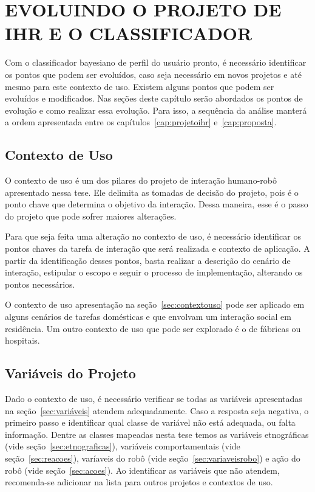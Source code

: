 \chapter{EVOLUINDO O PROJETO DE IHR E O CLASSIFICADOR}
\label{cap:evolucao}
Com o classificador bayesiano de perfil do usuário pronto, é necessário identificar os pontos que podem ser evoluídos, caso seja necessário em novos projetos e até mesmo para este contexto de uso. Existem alguns pontos que podem ser evoluídos e modificados. Nas seções deste capítulo serão abordados os pontos de evolução e como realizar essa evolução. Para isso, a sequência da análise manterá a ordem apresentada entre os capítulos~\ref{cap:projetoihr} e~\ref{cap:proposta}.

\section{Contexto de Uso}
\label{sec:contextouso2}
O contexto de uso é um dos pilares do projeto de interação humano-robô apresentado nessa tese. Ele delimita as tomadas de decisão do projeto, pois é o ponto chave que determina o objetivo da interação. Dessa maneira, esse é o passo do projeto que pode sofrer maiores alterações.

Para que seja feita uma alteração no contexto de uso, é necessário identificar os pontos chaves da tarefa de interação que será realizada e contexto de aplicação. A partir da identificação desses pontos, basta realizar a descrição do cenário de interação, estipular o escopo e seguir o processo de implementação, alterando os pontos necessários.

O contexto de uso apresentação na seção~\ref{sec:contextouso} pode ser aplicado em alguns cenários de tarefas domésticas e que envolvam um interação social em residência. Um outro contexto de uso que pode ser explorado é o de fábricas ou hospitais.

\section{Variáveis do Projeto}
\label{sec:variaveisprojeto2}
Dado o contexto de uso, é necessário verificar se todas as variáveis apresentadas na seção~\ref{sec:variáveis} atendem adequadamente. Caso a resposta seja negativa, o primeiro passo e identificar qual classe de variável não está adequada, ou falta informação. Dentre as classes mapeadas nesta tese temos as variáveis etnográficas (vide seção~\ref{sec:etnograficas}), variáveis comportamentais (vide seção~\ref{sec:reacoes}), varíaveis do robô (vide seção~\ref{sec:variaveisrobo}) e ação do robô (vide seção~\ref{sec:acoes}). Ao identificar as variáveis que não atendem, recomenda-se adicionar na lista para outros projetos e contextos de uso.

